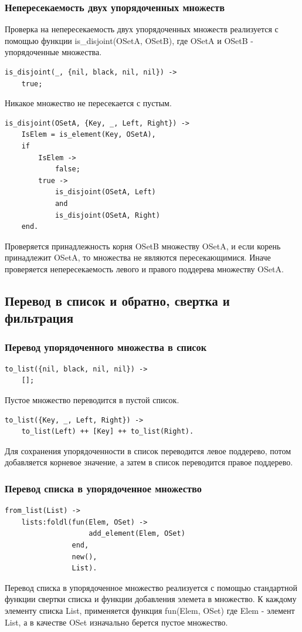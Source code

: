 		\subsubsection{Непересекаемость двух упорядоченных множеств}
			Проверка на непересекаемость двух упорядоченных множеств реализуется с помощью функции
			is\_disjoint(OSetA, OSetB), где OSetA и OSetB - упорядоченные множества.
			\begin{lstlisting}
is_disjoint(_, {nil, black, nil, nil}) ->
    true;	
			\end{lstlisting}
			Никакое множество не пересекается с пустым.
			\begin{lstlisting}
is_disjoint(OSetA, {Key, _, Left, Right}) ->
    IsElem = is_element(Key, OSetA),
    if
        IsElem -> 
            false;
        true -> 
            is_disjoint(OSetA, Left) 
            and 
            is_disjoint(OSetA, Right)
	end.
			\end{lstlisting}
			Проверяется принадлежность корня OSetB множеству OSetA, и если корень
			принадлежит OSetA, то множества не являются пересекающимися. Иначе
			проверяется непересекаемость левого и правого поддерева множеству OSetA.
		
		
	\subsection{Перевод в список и обратно, свертка и фильтрация}
		\subsubsection{Перевод упорядоченного множества в список}
			\begin{lstlisting}
to_list({nil, black, nil, nil}) ->
    [];
			\end{lstlisting}
			Пустое множество переводится в пустой список.
			\begin{lstlisting}
to_list({Key, _, Left, Right}) ->
    to_list(Left) ++ [Key] ++ to_list(Right).
			\end{lstlisting}
			Для сохранения упорядоченности в список переводится левое поддерево, потом 
			добавляется корневое значение, а затем в список переводится правое поддерево.
			
		\subsubsection{Перевод списка в упорядоченное множество}
			\begin{lstlisting}
from_list(List) ->
    lists:foldl(fun(Elem, OSet) -> 
                    add_element(Elem, OSet) 
                end, 
                new(), 
                List).
			\end{lstlisting}			
			Перевод списка в упорядоченное множество реализуется с помощью стандартной 
			функции свертки списка и функции добавления элемета в множество. К каждому 
			элементу списка List, применяется функция fun(Elem, OSet) где Elem - элемент
			List, а в качестве OSet изначально берется пустое множество.
			
